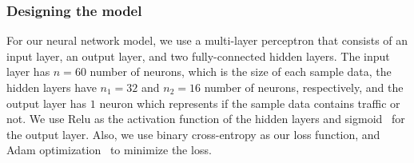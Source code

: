\subsubsection{Designing the model}
For our neural network model, we use a multi-layer perceptron that 
consists of an input layer, an output layer, and two fully-connected hidden layers. The input layer has $n=60$ number of neurons, which is the size of each sample data, the hidden layers have $n_1=32$ and $n_2 = 16$ number of neurons, respectively, and the output layer has $1$ neuron which represents if the sample data contains \bc 
traffic or not. We use Relu as the activation function of the hidden layers and 
sigmoid~\cite{deep_learning_book} for the output layer. Also, we use binary cross-entropy as our loss function, and Adam optimization~\cite{adam} to minimize the loss. %


























\begin{comment}
\paragraphb{Extension to Compact Blocks}
The classifier described above works best for the traditional full block relaying mode in which 
\bc peers receive the full blocks at the expected times. 
However, the correlation is weaker in the compact block relaying mode, 
since  only a sketch of each block will be downloaded by each peer, and the sketch will be different for different peers. 
We therefore need to adjust the parameters  of our classifier
(\textit{window size}, $J$) for compact block users. 


According to figure ~\ref{fig:cmpctblock_traffic_volume}, the volume of each compact block has an average of around 13 KB. This value will make the ratio $\frac{block\ size}{BW}$ negligible in comparison to $delta$. So, we consider $\omega$ approximately equal to $delta$. 
Since our experiments is for the high bandwidth mode, the receiving node might receive one block from multiple outgoing nodes. This will make the spike much larger than the average block size shown in Figure~\ref{fig:cmpctblock_traffic_volume}. Also, we consider the average volume of requested transactions. We calculate $\tau$ as follow:
\begin{align*}
\tau_i = 4 \times avg(compact\ block\ size) + avg(requested\ \code{txn}\ volume)
\end{align*}

We use a factor of 4 because in our setting we see that the client receives the transactions from 4 neighbors. 
\end{comment}


